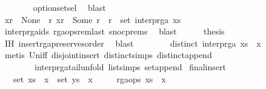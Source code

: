 \begin{isabellebody}
\ \ \ \ \ \ \isamarkupfalse%
\ option{\isachardot}set{\isacharunderscore}sel\ \isamarkupfalse%
\ blast\isanewline
\ \ \ \ \isamarkupfalse%
\ {\isachardoublequoteopen}xr\ {\isacharequal}\ None\ {\isasymor}\ {\isacharparenleft}{\isasymexists}r{\isachardot}\ xr\ {\isacharequal}\ Some\ r\ {\isasymand}\ r\ {\isasymin}\ set\ {\isacharparenleft}interp{\isacharunderscore}rga\ xs{\isacharparenright}{\isacharparenright}{\isachardoublequoteclose}\isanewline
\ \ \ \ \ \ \isamarkupfalse%
\ interp{\isacharunderscore}rga{\isacharunderscore}ids\ rga{\isacharunderscore}ops{\isacharunderscore}rem{\isacharunderscore}last\ snoc{\isachardot}prems\ \isamarkupfalse%
\ blast\isanewline
\ \ \ \ \isamarkupfalse%
\ {\isacharquery}thesis\isanewline
\ \ \ \ \ \ \isamarkupfalse%
\ IH\ insert{\isacharunderscore}rga{\isacharunderscore}preserves{\isacharunderscore}order\ \isamarkupfalse%
\ blast\isanewline
\ \ \isamarkupfalse%
\isanewline
\ \ \isamarkupfalse%
\ \isamarkupfalse%
\ {\isachardoublequoteopen}distinct\ {\isacharparenleft}interp{\isacharunderscore}rga\ {\isacharparenleft}xs\ {\isacharat}\ {\isacharbrackleft}x{\isacharbrackright}{\isacharparenright}{\isacharparenright}{\isachardoublequoteclose}\ \isanewline
\ \ \ \ \isamarkupfalse%
\ {\isacharparenleft}metis\ Un{\isacharunderscore}iff\ disjoint{\isacharunderscore}insert{\isacharparenleft}{}{\isacharparenright}\ distinct{\isachardot}simps{\isacharparenleft}{}{\isacharparenright}\ distinct{\isacharunderscore}append\ \isanewline
\ \ \ \ \ \ \ \ interp{\isacharunderscore}rga{\isacharunderscore}tail{\isacharunderscore}unfold\ list{\isachardot}simps{\isacharparenleft}{}{}{\isacharparenright}\ set{\isacharunderscore}append{\isacharparenright}\isanewline
{}\isamarkupfalse%
%
\endisatagproof
{\isafoldproof}%
%
\isadelimproof
%
\endisadelimproof
%
\isamarkuptrue%
\isamarkupfalse%
\ final{\isacharunderscore}insert{\isacharcolon}\isanewline
\ \ \ {\isachardoublequoteopen}set\ {\isacharparenleft}xs\ {\isacharat}\ {\isacharbrackleft}x{\isacharbrackright}{\isacharparenright}\ {\isacharequal}\ set\ {\isacharparenleft}ys\ {\isacharat}\ {\isacharbrackleft}x{\isacharbrackright}{\isacharparenright}{\isachardoublequoteclose}\isanewline
\ \ \ \ \ {\isachardoublequoteopen}rga{\isacharunderscore}ops\ {\isacharparenleft}xs\ {\isacharat}\ {\isacharbrackleft}x{\isacharbrackright}{\isacharparenright}{\isachardoublequoteclose}\isanewline

\end{isabellebody}

